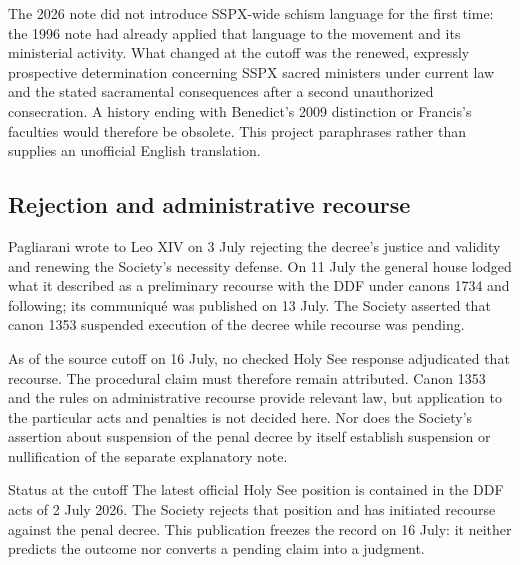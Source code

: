 The 2026 note did not introduce SSPX-wide schism language for the first time: the 1996 note had already applied that language to the movement and its ministerial activity. What changed at the cutoff was the renewed, expressly prospective determination concerning SSPX sacred ministers under current law and the stated sacramental consequences after a second unauthorized consecration. A history ending with Benedict's 2009 distinction or Francis's faculties would therefore be obsolete. This project paraphrases rather than supplies an unofficial English translation.


\subsection{Rejection and administrative recourse}

Pagliarani wrote to Leo XIV on 3 July rejecting the decree's justice and validity and renewing the Society's necessity defense. On 11 July the general house lodged what it described as a preliminary recourse with the DDF under canons 1734 and following; its communiqué was published on 13 July. The Society asserted that canon 1353 suspended execution of the decree while recourse was pending.

As of the source cutoff on 16 July, no checked Holy See response adjudicated that recourse. The procedural claim must therefore remain attributed. Canon 1353 and the rules on administrative recourse provide relevant law, but application to the particular acts and penalties is not decided here. Nor does the Society's assertion about suspension of the penal decree by itself establish suspension or nullification of the separate explanatory note.

\begin{studybox}{Status at the cutoff}
The latest official Holy See position is contained in the DDF acts of 2 July 2026. The Society rejects that position and has initiated recourse against the penal decree. This publication freezes the record on 16 July: it neither predicts the outcome nor converts a pending claim into a judgment.
\end{studybox}

